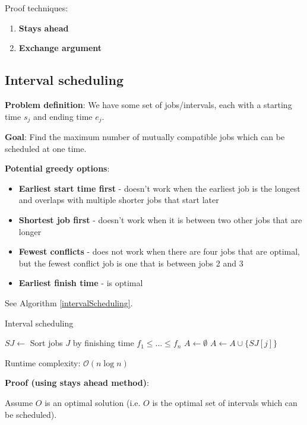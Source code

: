 \documentclass{article}
\newcommand{\Oh}{\mathcal{O}}
\begin{document}
Proof techniques:
\begin{enumerate}
    \item \textbf{Stays ahead}
    \item \textbf{Exchange argument}
\end{enumerate}

\subsection{Interval scheduling}
\textbf{Problem definition}: We have some set of jobs/intervals, each with a starting time $s_j$ and ending time $e_j$.

\textbf{Goal}: Find the maximum number of mutually compatible jobs which can be scheduled at one time.

\textbf{Potential greedy options}:
\begin{itemize}
    \item \textbf{Earliest start time first} - doesn't work when the earliest job is the longest and overlaps with multiple shorter jobs that start later
    \item \textbf{Shortest job first} - doesn't work when it is between two other jobs that are longer
    \item \textbf{Fewest conflicts} - does not work when there are four jobs that are optimal, but the fewest conflict job is one that is between jobs 2 and 3
    \item \textbf{Earliest finish time} - is optimal
\end{itemize}

See Algorithm \ref{intervalScheduling}.

\begin{algorithm}
\caption{Interval scheduling}\label{intervalScheduling}
\begin{algorithmic}[1]
    \State $SJ \gets$ Sort jobs $J$ by finishing time $f_1 \leq \dots \leq f_n$
    \State $A \gets \emptyset$
            \State $A \gets A \cup \{SJ[j]\}$
        \EndIf
    \EndFor
\EndProcedure
\end{algorithmic}
\end{algorithm}

Runtime complexity: $\Oh(n \log n)$

\textbf{Proof (using stays ahead method)}:

Assume $O$ is an optimal solution (i.e. $O$ is the optimal set of intervals which can be scheduled).
\end{document}
